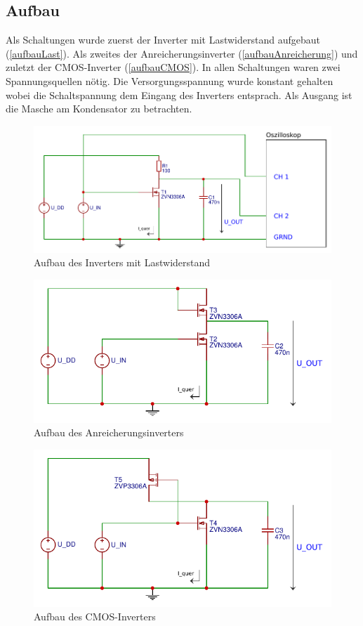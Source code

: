 \documentclass[11pt, a4paper]{article}
\begin{document}
\subsection*{Aufbau}
Als Schaltungen wurde zuerst der Inverter mit Lastwiderstand aufgebaut (\autoref{aufbauLast}). Als zweites der Anreicherungsinverter (\autoref{aufbauAnreicherung}) und zuletzt der CMOS-Inverter (\autoref{aufbauCMOS}).
In allen Schaltungen waren zwei Spannungsquellen nötig. Die Versorgungsspannung wurde konstant gehalten wobei die Schaltspannung dem Eingang des Inverters entsprach. Als Ausgang ist die Masche am Kondensator zu betrachten.
\begin{figure}
    \centering
    \includegraphics[width=\linewidth]{aufbauLast.pdf}
    \caption{Aufbau des Inverters mit Lastwiderstand}
    \label{aufbauLast}
\end{figure}
\begin{figure}
    \centering
    \includegraphics[width=\linewidth]{aufbauAnreicherung.pdf}
    \caption{Aufbau des Anreicherungsinverters}
    \label{aufbauAnreicherung}
\end{figure}
\begin{figure}
    \centering
    \includegraphics[width=\linewidth]{aufbauCMOS.pdf}
    \caption{Aufbau des CMOS-Inverters}
    \label{aufbauCMOS}
\end{figure}
\end{document}
